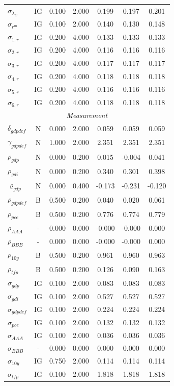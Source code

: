 \documentclass[12pt]{article}
\begin{document}
{\begin{longtable}{lcccccc}
$\sigma_{\lambda_w}$ & IG &    0.100 &    2.000 &    0.199 &    0.197 &    0.201 \\
$\sigma_{r^m}$ & IG &    0.100 &    2.000 &    0.140 &    0.130 &    0.148 \\
$\sigma_{1,r}$ & IG &    0.200 &    4.000 &    0.133 &    0.133 &    0.133 \\
$\sigma_{2,r}$ & IG &    0.200 &    4.000 &    0.116 &    0.116 &    0.116 \\
$\sigma_{3,r}$ & IG &    0.200 &    4.000 &    0.117 &    0.117 &    0.117 \\
$\sigma_{4,r}$ & IG &    0.200 &    4.000 &    0.118 &    0.118 &    0.118 \\
$\sigma_{5,r}$ & IG &    0.200 &    4.000 &    0.116 &    0.116 &    0.116 \\
$\sigma_{6,r}$ & IG &    0.200 &    4.000 &    0.118 &    0.118 &    0.118 \\
\multicolumn{7}{c}{\textit{Measurement}} \\[3pt]
$\delta_{gdpdef}$ & N &    0.000 &    2.000 &    0.059 &    0.059 &    0.059 \\
$\gamma_{gdpdef}$ & N &    1.000 &    2.000 &    2.351 &    2.351 &    2.351 \\
$\rho_{gdp}$ & N &    0.000 &    0.200 &    0.015 &   -0.004 &    0.041 \\
$\rho_{gdi}$ & N &    0.000 &    0.200 &    0.340 &    0.301 &    0.398 \\
$\varrho_{gdp}$ & N &    0.000 &    0.400 &   -0.173 &   -0.231 &   -0.120 \\
$\rho_{gdpdef}$ & B &    0.500 &    0.200 &    0.040 &    0.020 &    0.061 \\
$\rho_{pce}$ & B &    0.500 &    0.200 &    0.776 &    0.774 &    0.779 \\
$\rho_{AAA}$ & - &    0.000 &    0.000 &   -0.000 &   -0.000 &    0.000 \\
$\rho_{BBB}$ & - &    0.000 &    0.000 &   -0.000 &   -0.000 &    0.000 \\
$\rho_{10y}$ & B &    0.500 &    0.200 &    0.961 &    0.960 &    0.963 \\
$\rho_{tfp}$ & B &    0.500 &    0.200 &    0.126 &    0.090 &    0.163 \\
$\sigma_{gdp}$ & IG &    0.100 &    2.000 &    0.083 &    0.083 &    0.083 \\
$\sigma_{gdi}$ & IG &    0.100 &    2.000 &    0.527 &    0.527 &    0.527 \\
$\sigma_{gdpdef}$ & IG &    0.100 &    2.000 &    0.224 &    0.224 &    0.224 \\
$\sigma_{pce}$ & IG &    0.100 &    2.000 &    0.132 &    0.132 &    0.132 \\
$\sigma_{AAA}$ & IG &    0.100 &    2.000 &    0.036 &    0.036 &    0.036 \\
$\sigma_{BBB}$ & - &    0.000 &    0.000 &    0.000 &    0.000 &    0.000 \\
$\sigma_{10y}$ & IG &    0.750 &    2.000 &    0.114 &    0.114 &    0.114 \\
$\sigma_{tfp}$ & IG &    0.100 &    2.000 &    1.818 &    1.818 &    1.818 \\
\end{longtable}}
\end{document}

